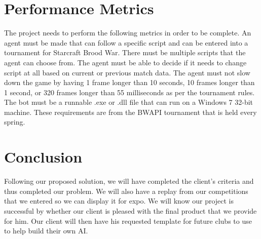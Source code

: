 \documentclass[10pt,letterpaper,onecolumn,draftclsnofoot]{IEEEtran}
\begin{document}
\section{Performance Metrics}
The project needs to perform the following metrics in order to be complete. An agent must be made that can follow a specific script and can be entered into a tournament for Starcraft Brood War. There must be multiple scripts that the agent can choose from. The agent must be able to decide if it needs to change script at all based on current or previous match data. The agent must not slow down the game by having 1 frame longer than 10 seconds, 10 frames longer than 1 second, or 320 frames longer than 55 milliseconds as per the tournament rules. The bot must be a runnable .exe or .dll file that can run on a Windows 7 32-bit machine. These requirements are from the BWAPI tournament that is held every spring.

\section{Conclusion}
Following our proposed solution, we will have completed the client's criteria and thus completed our problem. We will also have a replay from our competitions that we entered so we can display it for expo. We will know our project is successful by whether our client is pleased with the final product that we provide for him. Our client will then have his requested template for future clubs to use to help build their own AI.
\end{document}
